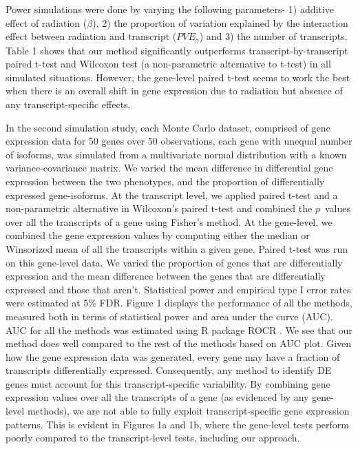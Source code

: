 \documentclass[hidelinks,11pt]{article}
\begin{document}
Power simulations were done by varying the following parameters- 1) additive effect of radiation ($\beta$), 2) the proportion of variation explained by the interaction effect between radiation and transcript ($PVE_\gamma$) and 3) the number of transcripts. Table 1 shows that our method significantly outperforms transcript-by-transcript paired t-test and Wilcoxon test (a non-parametric alternative to t-test) in all simulated situations. However, the gene-level paired t-test seems to work the best when there is an overall shift in gene expression due to radiation but absence of any transcript-specific effects. 

In the second simulation study, each Monte Carlo dataset, comprised of gene expression data for 50 genes over 50 observations, each gene with unequal number of isoforms, was simulated from a multivariate normal distribution with a known variance-covariance matrix. We varied the mean difference in differential gene expression between the two phenotypes, and the proportion of differentially expressed gene-isoforms. At the transcript level, we applied paired t-test and a non-parametric alternative in Wilcoxon's paired t-test and combined the $p$~values over all the transcripts of a gene using Fisher's method. At the gene-level, we combined the gene expression values by computing either the median or Winsorized mean of all the transcripts within a given gene. Paired t-test was run on this gene-level data. We varied the proportion of genes that are differentially expression and the mean difference between the genes that are differentially expressed and those that aren't. Statistical power and empirical type I error rates were estimated at 5\% FDR. Figure 1 displays the performance of all the methods, measured both in terms of statistical power and area under the curve (AUC). AUC for all the methods was estimated using R package ROCR \cite{rocr}. We see that our method does well compared to the rest of the methods based on AUC plot. Given how the gene expression data was generated, every gene may have a fraction of transcripts differentially expressed. Consequently, any method to identify DE genes must account for this transcript-specific variability. By combining gene expression values over all the transcripts of a gene (as evidenced by any gene-level methods), we are not able to fully exploit transcript-specific gene expression patterns. This is evident in Figures 1a and 1b, where the gene-level tests perform poorly compared to the transcript-level tests, including our approach.
\end{document}
